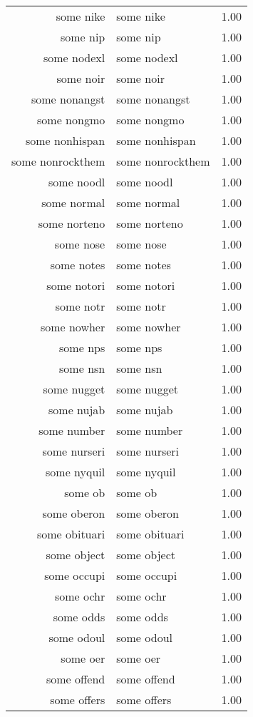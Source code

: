 \begin{table}[ht]
\begin{tabular}{rlr}
  some nike & some nike & 1.00 \\ 
  some nip & some nip & 1.00 \\ 
  some nodexl & some nodexl & 1.00 \\ 
  some noir & some noir & 1.00 \\ 
  some nonangst & some nonangst & 1.00 \\ 
  some nongmo & some nongmo & 1.00 \\ 
  some nonhispan & some nonhispan & 1.00 \\ 
  some nonrockthem & some nonrockthem & 1.00 \\ 
  some noodl & some noodl & 1.00 \\ 
  some normal & some normal & 1.00 \\ 
  some norteno & some norteno & 1.00 \\ 
  some nose & some nose & 1.00 \\ 
  some notes & some notes & 1.00 \\ 
  some notori & some notori & 1.00 \\ 
  some notr & some notr & 1.00 \\ 
  some nowher & some nowher & 1.00 \\ 
  some nps & some nps & 1.00 \\ 
  some nsn & some nsn & 1.00 \\ 
  some nugget & some nugget & 1.00 \\ 
  some nujab & some nujab & 1.00 \\ 
  some number & some number & 1.00 \\ 
  some nurseri & some nurseri & 1.00 \\ 
  some nyquil & some nyquil & 1.00 \\ 
  some ob & some ob & 1.00 \\ 
  some oberon & some oberon & 1.00 \\ 
  some obituari & some obituari & 1.00 \\ 
  some object & some object & 1.00 \\ 
  some occupi & some occupi & 1.00 \\ 
  some ochr & some ochr & 1.00 \\ 
  some odds & some odds & 1.00 \\ 
  some odoul & some odoul & 1.00 \\ 
  some oer & some oer & 1.00 \\ 
  some offend & some offend & 1.00 \\ 
  some offers & some offers & 1.00 \\ 

\end{tabular}
\end{table}
